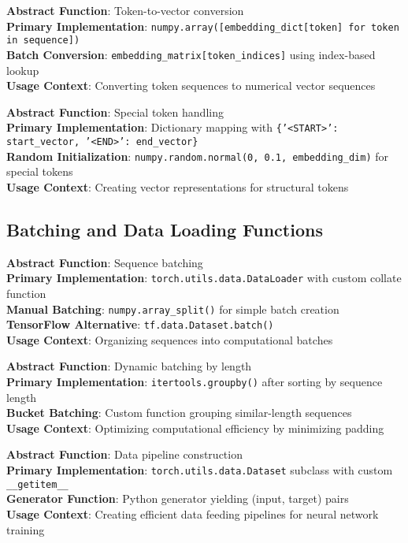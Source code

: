 \documentclass[11pt,a4paper]{article}
\begin{document}
\textbf{Abstract Function}: Token-to-vector conversion \\
\textbf{Primary Implementation}: \texttt{numpy.array([embedding\_dict[token] for token in sequence])} \\
\textbf{Batch Conversion}: \texttt{embedding\_matrix[token\_indices]} using index-based lookup \\
\textbf{Usage Context}: Converting token sequences to numerical vector sequences

\textbf{Abstract Function}: Special token handling \\
\textbf{Primary Implementation}: Dictionary mapping with \texttt{\{'<START>': start\_vector, '<END>': end\_vector\}} \\
\textbf{Random Initialization}: \texttt{numpy.random.normal(0, 0.1, embedding\_dim)} for special tokens \\
\textbf{Usage Context}: Creating vector representations for structural tokens

\subsection{Batching and Data Loading Functions}

\textbf{Abstract Function}: Sequence batching \\
\textbf{Primary Implementation}: \texttt{torch.utils.data.DataLoader} with custom collate function \\
\textbf{Manual Batching}: \texttt{numpy.array\_split()} for simple batch creation \\
\textbf{TensorFlow Alternative}: \texttt{tf.data.Dataset.batch()} \\
\textbf{Usage Context}: Organizing sequences into computational batches

\textbf{Abstract Function}: Dynamic batching by length \\
\textbf{Primary Implementation}: \texttt{itertools.groupby()} after sorting by sequence length \\
\textbf{Bucket Batching}: Custom function grouping similar-length sequences \\
\textbf{Usage Context}: Optimizing computational efficiency by minimizing padding

\textbf{Abstract Function}: Data pipeline construction \\
\textbf{Primary Implementation}: \texttt{torch.utils.data.Dataset} subclass with custom \texttt{\_\_getitem\_\_} \\
\textbf{Generator Function}: Python generator yielding (input, target) pairs \\
\textbf{Usage Context}: Creating efficient data feeding pipelines for neural network training
\end{document}
